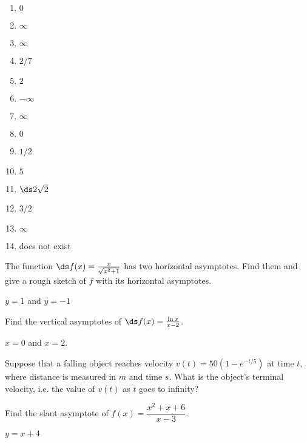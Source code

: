 \begin{enumialphparenastyle}
\begin{ex}
\begin{sol}
\begin{multicols}{3}
\begin{enumerate}
	\item	$0$
	\item	$\infty$
	\item	$\infty$
	\item	$2/7$
	\item	$2$
	\item	$-\infty$
	\item	$\infty$
	\item	$0$
	\item	$1/2$
	\item	$5$
	\item	$\ds 2\sqrt2$
	\item	$3/2$
	\item	$\infty$
	\item	does not exist
\end{enumerate}
\end{multicols}
\end{sol}
\end{ex}


\begin{ex} 
The function $\ds f(x) = {x\over\sqrt{x^2+1}}$ has two horizontal asymptotes.  Find them and give a rough sketch of $f$ with its horizontal asymptotes. 
\begin{sol}
$y=1$ and $y=-1$
\end{sol}
\end{ex}

\begin{ex}
Find the vertical asymptotes of $\ds f(x)=\frac{\ln x}{x-2}$.
\begin{sol}
	$x=0$ and $x=2$.
\end{sol}
\end{ex}

\begin{ex}
Suppose that a falling object reaches velocity $v(t)=50(1-e^{-t/5})$ at time $t$, where distance is measured in $m$ and time $s$. What is the object's terminal velocity, i.e. the value of $v(t)$ as $t$ goes to infinity?
\end{ex}

\begin{ex}
Find the slant asymptote of $f(x)=\dfrac{x^2+x+6}{x-3}$.
\begin{sol}
	$y=x+4$
\end{sol}
\end{ex}



\end{enumialphparenastyle}
